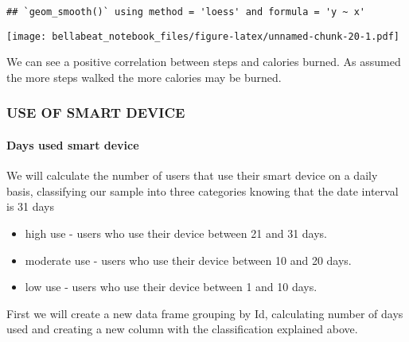 \documentclass[
]{article}
\providecommand{\tightlist}{%
  \setlength{\itemsep}{0pt}\setlength{\parskip}{0pt}}
\begin{document}
\begin{verbatim}
## `geom_smooth()` using method = 'loess' and formula = 'y ~ x'
\end{verbatim}

\texttt{[image: bellabeat\_notebook\_files/figure-latex/unnamed-chunk-20-1.pdf]}

We can see a positive correlation between steps and calories burned. As
assumed the more steps walked the more calories may be burned.

\hypertarget{use-of-smart-device}{%
\subsubsection{USE OF SMART DEVICE}\label{use-of-smart-device}}

\hypertarget{days-used-smart-device}{%
\paragraph{Days used smart device}\label{days-used-smart-device}}

We will calculate the number of users that use their smart device on a
daily basis, classifying our sample into three categories knowing that
the date interval is 31 days

\begin{itemize}
\tightlist
\item
  high use - users who use their device between 21 and 31 days.
\item
  moderate use - users who use their device between 10 and 20 days.
\item
  low use - users who use their device between 1 and 10 days.
\end{itemize}

First we will create a new data frame grouping by Id, calculating number
of days used and creating a new column with the classification explained
above.
\end{document}
